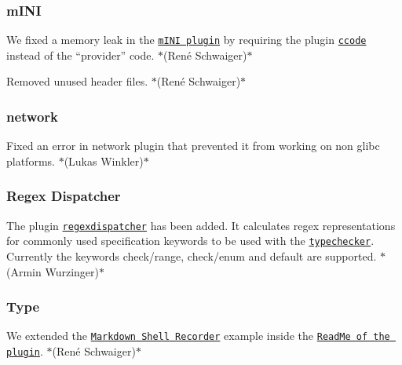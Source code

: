 \subsubsection*{m\+I\+NI}


\begin{DoxyItemize}
\item We fixed a memory leak in the \href{https://libelektra.org/plugins/mini}{\tt m\+I\+NI plugin} by requiring the plugin \href{https://libelektra.org/plugins/ccode}{\tt {\ttfamily ccode}} instead of the “provider” {\ttfamily code}. $\ast$(René Schwaiger)$\ast$
\item Removed unused header files. $\ast$(René Schwaiger)$\ast$
\end{DoxyItemize}

\subsubsection*{network}


\begin{DoxyItemize}
\item Fixed an error in network plugin that prevented it from working on non glibc platforms. $\ast$(Lukas Winkler)$\ast$
\end{DoxyItemize}

\subsubsection*{Regex Dispatcher}


\begin{DoxyItemize}
\item The plugin \href{https://www.libelektra.org/plugins/regexdispatcher}{\tt regexdispatcher} has been added. It calculates regex representations for commonly used specification keywords to be used with the \href{https://www.libelektra.org/plugins/typechecker}{\tt typechecker}. Currently the keywords {\ttfamily check/range}, {\ttfamily check/enum} and {\ttfamily default} are supported. $\ast$(Armin Wurzinger)$\ast$
\end{DoxyItemize}

\subsubsection*{Type}


\begin{DoxyItemize}
\item We extended the \href{https://master.libelektra.org/tests/shell/shell_recorder/tutorial_wrapper}{\tt Markdown Shell Recorder} example inside the \href{https://www.libelektra.org/plugins/type}{\tt Read\+Me of the plugin}. $\ast$(René Schwaiger)$\ast$
\end{DoxyItemize}

